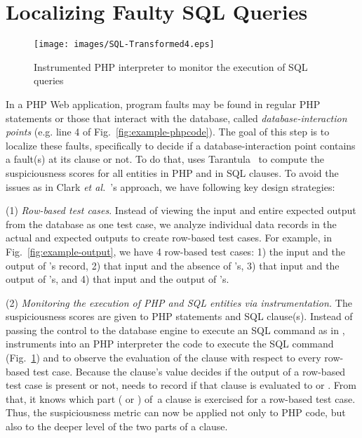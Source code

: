 \section{Localizing Faulty SQL Queries}


\begin{figure}[tbp]
  \centering
  \texttt{[image: images/SQL-Transformed4.eps]} %
 \caption{Instrumented PHP interpreter to monitor the execution of SQL queries}\label{fig:SQL-Transformed}
\end{figure}

In a PHP Web application, program faults may be found in regular PHP
statements or those that interact with the database, called
\emph{database-interaction points} (e.g. line 4 of
Fig.~\ref{fig:example-phpcode}). The goal of this step is to
localize these faults, specifically to decide if a
database-interaction point contains a fault(s) at its 
clause or not. To do that, {\tool} uses
Tarantula~\cite{tarantula05} to compute the suspiciousness scores for
all entities in PHP and in SQL  clauses. To avoid the
issues as in Clark {\em et al.}~\cite{ga-ase11}'s approach, we have
following key design strategies:

(1) {\em Row-based test cases}. 
Instead of viewing the input and entire expected output from the
database as one test case, we analyze individual data records in
the actual and expected outputs to create row-based test cases. For
example, in Fig.~\ref{fig:example-output}, we have 4 row-based test
cases: 1) the input  and the output of 's record, 2) that
input and the absence of 's, 3) that input and the output of
's, and 4) that input and the output of 's.

(2) {\em Monitoring the execution of PHP and SQL entities via
instrumentation.} The suspiciousness scores are given to PHP
statements and SQL  clause(s). Instead of passing the
control to the database engine to execute an SQL command as in 
\cite{ga-ase11}, {\tool} instruments into an PHP interpreter the code
to execute the SQL command (Fig.~\ref{fig:SQL-Transformed}) and to
observe the evaluation of the  clause with respect to
every row-based test case.  Because the  clause's value
decides if the output of a row-based test case is present or not,
{\tool} needs to record if that clause is evaluated to  or
. From that, it knows which part ( or
) of~a  clause is exercised for a row-based
test case. Thus, the suspiciousness metric can now be applied not only
to PHP code, but also to the deeper level of the two parts of a
 clause.

